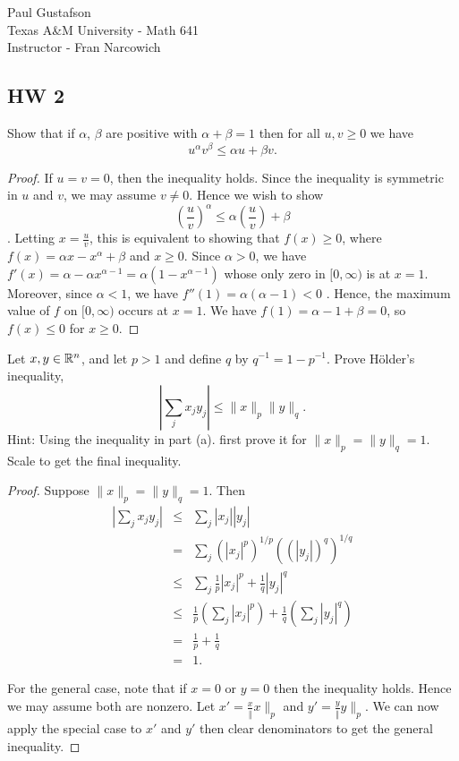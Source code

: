 \documentclass{article}
\begin{document}
\noindent Paul Gustafson\\
\noindent Texas A\&M University - Math 641\\ 
\noindent Instructor - Fran Narcowich

\subsection*{HW 2}
 Show that if $\alpha$, $\beta$ are positive with $\alpha + \beta = 1$ then for all $u,v \ge 0$ we have
$$ u^\alpha v^\beta \le \alpha u + \beta v.$$
\begin{proof} If $u = v = 0$, then the inequality holds. Since the inequality is symmetric in $u$ and $v$, we may assume $v \neq 0$.
Hence we wish to show
$$(\frac u v)^\alpha \le \alpha (\frac u v) + \beta$$.
Letting $x = \frac u v$, this is equivalent to showing that $f(x) \ge 0$, where $f(x) = \alpha x -  x^\alpha + \beta$ and $x \ge 0$.  
Since $\alpha > 0$, we have $f'(x) = \alpha - \alpha x^{\alpha - 1} = \alpha (1 - x^{\alpha - 1})$ whose only zero in $[0,\infty)$ is at $x = 1$.
Moreover, since $\alpha < 1$, we have $f''(1) = \alpha (\alpha - 1) < 0$ . Hence, the maximum value of $f$ on $[0, \infty)$ occurs at $x = 1$.
We have $f(1) = \alpha -1 + \beta = 0$, so $f(x) \le 0$ for $x \ge 0$.
\end{proof}

 Let $x,y \in \mathbb{R}^n$, and let $p > 1$ and define $q$ by $q^{-1} = 1 − p^{−1}$. Prove Hölder's inequality, 
$$|\sum_j x_j y_j| ≤ \|x\|_p \|y\|_q. $$
Hint: Using the inequality in part (a). first prove it for $\|x\|_p = \|y\|_q = 1$. Scale to get the final inequality.
\begin{proof}
Suppose $\|x\|_p = \|y\|_q = 1$. Then
\begin{align*}
| \sum_j x_j y_j | & \le & \sum_j |x_j| |y_j|
\\ &  = &  \sum_j (|x_j|^p)^{1/p} ((|y_j|)^q)^{1/q}
\\ & \le & \sum_j \frac 1 p |x_j|^p + \frac 1 q |y_j|^q
\\ & \le & \frac 1 p (\sum_j  |x_j|^p) + \frac 1 q (\sum_j |y_j|^q)
\\ & = & \frac 1 p + \frac 1 q
\\ & = & 1.
\end{align*}

For the general case, note that if $x = 0$ or $y = 0$ then the inequality holds. Hence we may assume both are nonzero.  
Let $x' = \frac x \|x\|_p$ and $y' = \frac y \|y\|_p$.  We can now apply the special case to $x'$ and $y'$ then clear denominators to get the general inequality.
\end{proof}
\end{document}
